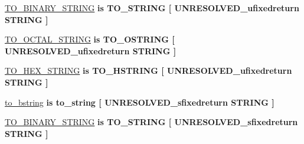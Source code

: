 \begin{DoxyCompactItemize}
\item 
\hyperlink{classfixed__pkg_a7b6f887c84119bff7ae832593ecb4149}{T\+O\+\_\+\+B\+I\+N\+A\+R\+Y\+\_\+\+S\+T\+R\+I\+N\+G}  {\bfseries {\bfseries \textcolor{keywordflow}{is}\textcolor{vhdlchar}{ }\textcolor{vhdlchar}{T\+O\+\_\+\+S\+T\+R\+I\+N\+G}\textcolor{vhdlchar}{ }\textcolor{vhdlchar}{\mbox{[}}\textcolor{vhdlchar}{ }\textcolor{vhdlchar}{U\+N\+R\+E\+S\+O\+L\+V\+E\+D\+\_\+ufixedreturn}\textcolor{vhdlchar}{ }\textcolor{comment}{S\+T\+R\+I\+N\+G}\textcolor{vhdlchar}{ }\textcolor{vhdlchar}{\mbox{]}}\textcolor{vhdlchar}{ }}} {\bfseries \textcolor{vhdlchar}{ }} 
\item 
\hyperlink{classfixed__pkg_a12ff3b142afffe809b1746be35f356d0}{T\+O\+\_\+\+O\+C\+T\+A\+L\+\_\+\+S\+T\+R\+I\+N\+G}  {\bfseries {\bfseries \textcolor{keywordflow}{is}\textcolor{vhdlchar}{ }\textcolor{vhdlchar}{T\+O\+\_\+\+O\+S\+T\+R\+I\+N\+G}\textcolor{vhdlchar}{ }\textcolor{vhdlchar}{\mbox{[}}\textcolor{vhdlchar}{ }\textcolor{vhdlchar}{U\+N\+R\+E\+S\+O\+L\+V\+E\+D\+\_\+ufixedreturn}\textcolor{vhdlchar}{ }\textcolor{comment}{S\+T\+R\+I\+N\+G}\textcolor{vhdlchar}{ }\textcolor{vhdlchar}{\mbox{]}}\textcolor{vhdlchar}{ }}} {\bfseries \textcolor{vhdlchar}{ }} 
\item 
\hyperlink{classfixed__pkg_a69dc30f49bfeb6ad2081d18ff834ee92}{T\+O\+\_\+\+H\+E\+X\+\_\+\+S\+T\+R\+I\+N\+G}  {\bfseries {\bfseries \textcolor{keywordflow}{is}\textcolor{vhdlchar}{ }\textcolor{vhdlchar}{T\+O\+\_\+\+H\+S\+T\+R\+I\+N\+G}\textcolor{vhdlchar}{ }\textcolor{vhdlchar}{\mbox{[}}\textcolor{vhdlchar}{ }\textcolor{vhdlchar}{U\+N\+R\+E\+S\+O\+L\+V\+E\+D\+\_\+ufixedreturn}\textcolor{vhdlchar}{ }\textcolor{comment}{S\+T\+R\+I\+N\+G}\textcolor{vhdlchar}{ }\textcolor{vhdlchar}{\mbox{]}}\textcolor{vhdlchar}{ }}} {\bfseries \textcolor{vhdlchar}{ }} 
\item 
\hyperlink{classfixed__pkg_ab0df1e66ba14653bc1c17d30b9c54ab3}{to\+\_\+bstring}  {\bfseries {\bfseries \textcolor{keywordflow}{is}\textcolor{vhdlchar}{ }\textcolor{vhdlchar}{to\+\_\+string}\textcolor{vhdlchar}{ }\textcolor{vhdlchar}{\mbox{[}}\textcolor{vhdlchar}{ }\textcolor{vhdlchar}{U\+N\+R\+E\+S\+O\+L\+V\+E\+D\+\_\+sfixedreturn}\textcolor{vhdlchar}{ }\textcolor{comment}{S\+T\+R\+I\+N\+G}\textcolor{vhdlchar}{ }\textcolor{vhdlchar}{\mbox{]}}\textcolor{vhdlchar}{ }}} {\bfseries \textcolor{vhdlchar}{ }} 
\item 
\hyperlink{classfixed__pkg_acb48821e2a7afd56952fba94ebfa178d}{T\+O\+\_\+\+B\+I\+N\+A\+R\+Y\+\_\+\+S\+T\+R\+I\+N\+G}  {\bfseries {\bfseries \textcolor{keywordflow}{is}\textcolor{vhdlchar}{ }\textcolor{vhdlchar}{T\+O\+\_\+\+S\+T\+R\+I\+N\+G}\textcolor{vhdlchar}{ }\textcolor{vhdlchar}{\mbox{[}}\textcolor{vhdlchar}{ }\textcolor{vhdlchar}{U\+N\+R\+E\+S\+O\+L\+V\+E\+D\+\_\+sfixedreturn}\textcolor{vhdlchar}{ }\textcolor{comment}{S\+T\+R\+I\+N\+G}\textcolor{vhdlchar}{ }\textcolor{vhdlchar}{\mbox{]}}\textcolor{vhdlchar}{ }}} {\bfseries \textcolor{vhdlchar}{ }} 

\end{DoxyCompactItemize}
